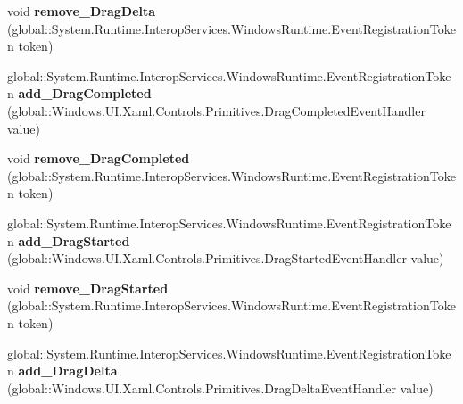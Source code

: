 \begin{DoxyCompactItemize}
void {\bfseries remove\+\_\+\+Drag\+Delta} (global\+::\+System.\+Runtime.\+Interop\+Services.\+Windows\+Runtime.\+Event\+Registration\+Token token)
\item 
\mbox{\label{interface_windows_1_1_u_i_1_1_xaml_1_1_controls_1_1_primitives_1_1_i_thumb_ad9d99e0f3518ed7231b6226b63c2d3e9}} 
global\+::\+System.\+Runtime.\+Interop\+Services.\+Windows\+Runtime.\+Event\+Registration\+Token {\bfseries add\+\_\+\+Drag\+Completed} (global\+::\+Windows.\+U\+I.\+Xaml.\+Controls.\+Primitives.\+Drag\+Completed\+Event\+Handler value)
\item 
\mbox{\label{interface_windows_1_1_u_i_1_1_xaml_1_1_controls_1_1_primitives_1_1_i_thumb_a9c342427ff81fa677a36391138856518}} 
void {\bfseries remove\+\_\+\+Drag\+Completed} (global\+::\+System.\+Runtime.\+Interop\+Services.\+Windows\+Runtime.\+Event\+Registration\+Token token)
\item 
\mbox{\label{interface_windows_1_1_u_i_1_1_xaml_1_1_controls_1_1_primitives_1_1_i_thumb_af16d7fcdb997b8237d826597ee4dfdf9}} 
global\+::\+System.\+Runtime.\+Interop\+Services.\+Windows\+Runtime.\+Event\+Registration\+Token {\bfseries add\+\_\+\+Drag\+Started} (global\+::\+Windows.\+U\+I.\+Xaml.\+Controls.\+Primitives.\+Drag\+Started\+Event\+Handler value)
\item 
\mbox{\label{interface_windows_1_1_u_i_1_1_xaml_1_1_controls_1_1_primitives_1_1_i_thumb_a160f1c382efe8c910b223fd4ae316948}} 
void {\bfseries remove\+\_\+\+Drag\+Started} (global\+::\+System.\+Runtime.\+Interop\+Services.\+Windows\+Runtime.\+Event\+Registration\+Token token)
\item 
\mbox{\label{interface_windows_1_1_u_i_1_1_xaml_1_1_controls_1_1_primitives_1_1_i_thumb_adb368ed2352b40482e7d4b409ff13165}} 
global\+::\+System.\+Runtime.\+Interop\+Services.\+Windows\+Runtime.\+Event\+Registration\+Token {\bfseries add\+\_\+\+Drag\+Delta} (global\+::\+Windows.\+U\+I.\+Xaml.\+Controls.\+Primitives.\+Drag\+Delta\+Event\+Handler value)

\end{DoxyCompactItemize}
